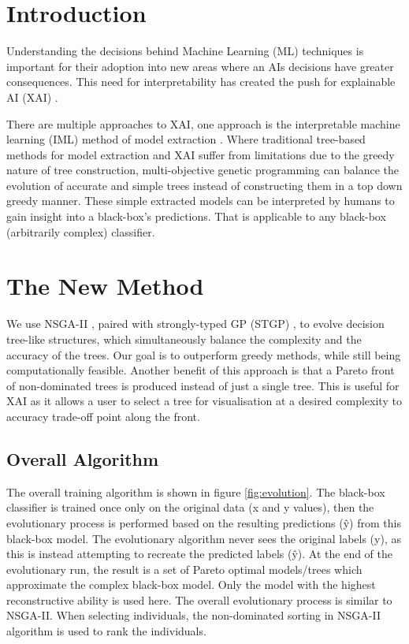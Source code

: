 \section{Introduction} 
Understanding the decisions behind Machine Learning (ML) techniques is important for their adoption into new areas where an AI\textquotesingle s decisions have greater consequences. This need for interpretability has created the push for explainable AI (XAI) \cite{Karlo:xai}.

There are multiple approaches to XAI, one approach is the interpretable machine learning (IML) method of model extraction \cite{Bastani:modelExtarct}. Where traditional tree-based methods for model extraction and XAI suffer from limitations due to the greedy nature of tree construction, multi-objective genetic programming can balance the evolution of accurate and simple trees instead of constructing them in a top down greedy manner. These simple extracted models can be interpreted by humans to gain insight into a black-box's predictions. That is applicable to any black-box (arbitrarily complex) classifier.


\section{The New Method}
We use NSGA-II \cite{Deb:nsga2}, paired with strongly-typed GP (STGP) \cite{Montana:stgp}, to evolve decision tree-like structures, which simultaneously balance the complexity and the accuracy of the trees. Our goal is to outperform greedy methods, while still being computationally feasible. Another benefit of this approach is that a Pareto front of non-dominated trees is produced instead of just a single tree. This is useful for XAI as it allows a user to select a tree for visualisation at a desired complexity to accuracy trade-off point along the front.
\subsection{Overall Algorithm}
The overall training algorithm is shown in figure \ref{fig:evolution}. The black-box classifier is trained once only on the original data (x and y values), then the evolutionary process is performed based on the resulting predictions (\^{y}) from this black-box model. The evolutionary algorithm never sees the original labels (y), as this is instead attempting to recreate the predicted labels (\^{y}). At the end of the evolutionary run, the result is a set of Pareto optimal models/trees which approximate the complex black-box model. Only the model with the highest reconstructive ability is used here. The overall evolutionary process is similar to NSGA-II. When selecting individuals, the non-dominated sorting in NSGA-II algorithm is used to rank the individuals.
